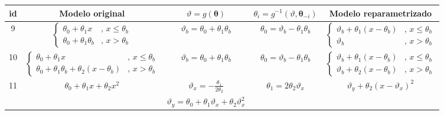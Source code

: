 \begin{tabular*}{\textwidth}{@{\extracolsep{\fill}}ccccc}
\hline 
id &
Modelo original & $\vartheta = g(\boldsymbol{\theta})$ & $\theta_i = g^{-1}(\vartheta, \boldsymbol{\theta}_{-i})$ & Modelo reparametrizado\tabularnewline
\hline 
9 &
$\begin{cases} \theta_0+\theta_1 x &,\, x\leq \theta_b \\  \theta_0+\theta_1 \theta_b &,\, x>\theta_b  \end{cases}$ &
$\vartheta_b = \theta_0+\theta_1 \theta_b$ &
$\theta_0 = \vartheta_b-\theta_1 \theta_b$ &
$\begin{cases} \vartheta_b+\theta_1(x-\theta_b) &,\, x\leq \theta_b \\ \vartheta_b &,\, x>\theta_b \end{cases}$\tabularnewline
10 &
$\begin{cases} \theta_0+\theta_1 x &,\, x\leq \theta_b \\ \theta_0+\theta_1 \theta_b+\theta_2(x-\theta_b) &,\, x> \theta_b \end{cases}$ &
$\vartheta_b = \theta_0+\theta_1 \theta_b$ &
$\theta_0 = \vartheta_b-\theta_1 \theta_b$ &
$\begin{cases} \vartheta_b+\theta_1(x-\theta_b) &,\, x\leq \theta_b \\ \vartheta_b+\theta_2(x-\theta_b) &,\, x> \theta_b \end{cases} $\tabularnewline
\multirow{2}{*}{11} &
\multirow{2}{*}{$\theta_0+\theta_1 x+\theta_2 x^2$} &
$\displaystyle\vartheta_x = -\frac{\theta_1}{2\theta_2}$ &
$\theta_1 = 2 \theta_2 \vartheta_x$ &
\multirow{2}{*}{$\vartheta_y+\theta_2(x-\vartheta_x)^2$}\tabularnewline
 & 
 &
$\vartheta_y = \theta_0+\theta_1\vartheta_x+\theta_2\vartheta_x^2$ &

\end{tabular*}
